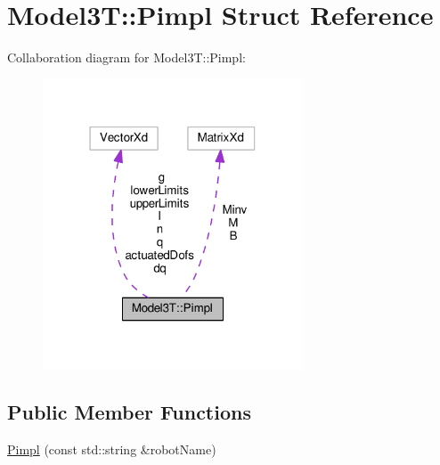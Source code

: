 \hypertarget{structModel3T_1_1Pimpl}{}\section{Model3T\+:\+:Pimpl Struct Reference}
\label{structModel3T_1_1Pimpl}


Collaboration diagram for Model3T\+:\+:Pimpl\+:
\nopagebreak
\begin{figure}[H]
\begin{center}
\leavevmode
\includegraphics[width=219pt]{dd/d13/structModel3T_1_1Pimpl__coll__graph}
\end{center}
\end{figure}
\subsection*{Public Member Functions}
\begin{DoxyCompactItemize}
\item 
\hyperlink{structModel3T_1_1Pimpl_a087fecc74d3a9f4867e971a6f4f379ef}{Pimpl} (const std\+::string \&robot\+Name)
\end{DoxyCompactItemize}
